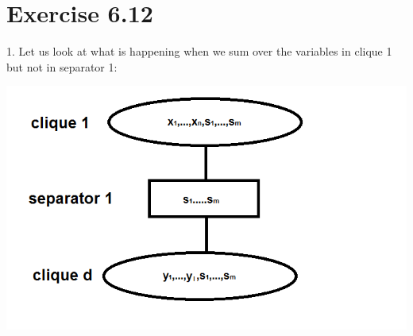 \documentclass[11pt,a4paper,oneside]{report}
\begin{document}
\section*{Exercise 6.12}

1. Let us look at what is happening when we sum over the variables in clique 1 but not in separator 1:

	\begin{center} \includegraphics[width=1\textwidth]{c6e12cliques}\end{center}  
	
\end{document}
